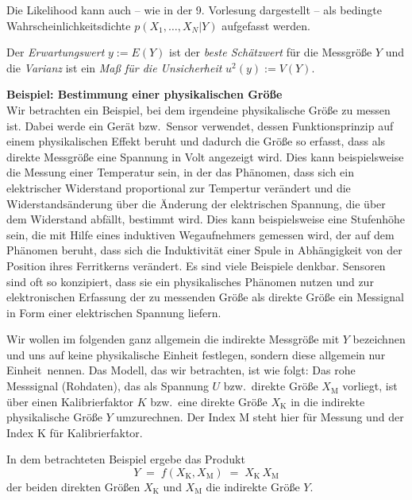 Die Likelihood kann auch -- wie in der 9. Vorlesung dargestellt -- als bedingte Wahrscheinlichkeitsdichte $p(X_1,\ldots,X_N|Y)$ aufgefasst werden. 

Der \textsl{Erwartungswert} $y := E(Y)$ ist der \textsl{beste Schätzwert} für die Messgröße $Y$ und die \textsl{Varianz} ist ein 
\textsl{Maß für die Unsicherheit} $u^2(y) := V(Y)$.

\textbf{Beispiel: Bestimmung einer physikalischen Größe}\\
Wir betrachten ein Beispiel, bei dem irgendeine physikalische Größe zu messen ist.
Dabei werde ein Gerät bzw.\ Sensor verwendet, dessen Funktionsprinzip auf einem
physikalischen Effekt beruht und dadurch die Größe so erfasst,
dass als direkte Messgröße eine Spannung in Volt angezeigt wird. Dies kann beispielsweise
die Messung einer Temperatur sein, in der das Phänomen, dass sich ein elektrischer
Widerstand proportional zur Tempertur verändert und die Widerstandsänderung über die
Änderung der elektrischen Spannung, die über dem Widerstand abfällt, bestimmt wird.
Dies kann beispielsweise eine Stufenhöhe sein, die mit Hilfe eines induktiven Wegaufnehmers
gemessen wird, der auf dem Phänomen beruht, dass sich die Induktivität einer Spule in Abhängigkeit
von der  Position ihres Ferritkerns verändert. Es sind viele Beispiele denkbar. Sensoren
sind oft so konzipiert, dass sie ein physikalisches Phänomen nutzen und zur elektronischen
Erfassung der zu messenden Größe als direkte Größe ein Messignal in Form einer elektrischen
Spannung liefern.

Wir wollen im folgenden ganz allgemein die indirekte Messgröße mit $Y$
bezeichnen und uns auf keine physikalische Einheit festlegen, sondern diese allgemein nur
\glqq Einheit\grqq ~nennen. Das Modell, das wir betrachten, ist wie folgt: Das rohe Messsignal (Rohdaten),
das als Spannung $U$ bzw.\ direkte Größe $X_\mathrm{M}$ vorliegt, ist über
einen Kalibrierfaktor $K$ bzw.\ eine direkte Größe $X_\mathrm{K}$
in die indirekte physikalische Größe $Y$ umzurechnen. 
Der Index M steht hier für Messung und der Index K für Kalibrierfaktor.

In dem betrachteten Beispiel
ergebe das Produkt
\begin{equation}
Y \; = \; f(X_\mathrm{K}, X_\mathrm{M})  \; = \; X_\mathrm{K} \, X_\mathrm{M}
\end{equation}
der beiden direkten Größen $X_\mathrm{K}$ und $X_\mathrm{M}$ die indirekte Größe $Y$.

